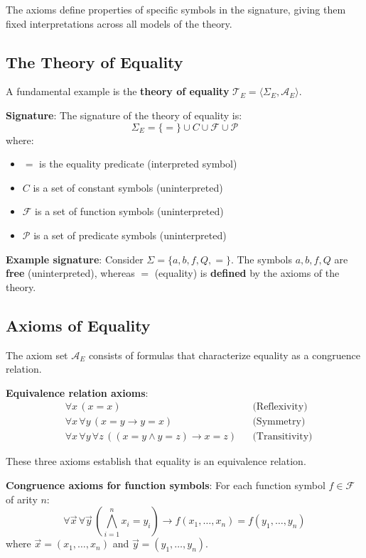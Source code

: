 \documentclass[11pt,a4paper]{article}
\theoremstyle{definition}
\theoremstyle{plain}
\theoremstyle{remark}
\begin{document}
The axioms define properties of specific symbols in the signature, giving them fixed interpretations across all models of the theory.

\subsection{The Theory of Equality}

A fundamental example is the \textbf{theory of equality} $\mathcal{T}_E = \langle \Sigma_E, \mathcal{A}_E \rangle$.

\textbf{Signature}: The signature of the theory of equality is:
\[
\Sigma_E = \{=\} \cup C \cup \mathcal{F} \cup \mathcal{P}
\]
where:
\begin{itemize}
    \item $=$ is the equality predicate (interpreted symbol)
    \item $C$ is a set of constant symbols (uninterpreted)
    \item $\mathcal{F}$ is a set of function symbols (uninterpreted)
    \item $\mathcal{P}$ is a set of predicate symbols (uninterpreted)
\end{itemize}

\textbf{Example signature}: Consider $\Sigma = \{a, b, f, Q, =\}$. The symbols $a, b, f, Q$ are \textbf{free} (uninterpreted), whereas $=$ (equality) is \textbf{defined} by the axioms of the theory.

\subsection{Axioms of Equality}

The axiom set $\mathcal{A}_E$ consists of formulas that characterize equality as a congruence relation.

\textbf{Equivalence relation axioms}:
\begin{align*}
&\forall x \, (x = x) && \text{(Reflexivity)} \\
&\forall x \, \forall y \, (x = y \rightarrow y = x) && \text{(Symmetry)} \\
&\forall x \, \forall y \, \forall z \, ((x = y \wedge y = z) \rightarrow x = z) && \text{(Transitivity)}
\end{align*}

These three axioms establish that equality is an equivalence relation.

\textbf{Congruence axioms for function symbols}: For each function symbol $f \in \mathcal{F}$ of arity $n$:
\[
\forall \vec{x} \, \forall \vec{y} \, \left( \bigwedge_{i=1}^{n} x_i = y_i \right) \rightarrow f(x_1, \dots, x_n) = f(y_1, \dots, y_n)
\]
where $\vec{x} = (x_1, \dots, x_n)$ and $\vec{y} = (y_1, \dots, y_n)$.
\end{document}
